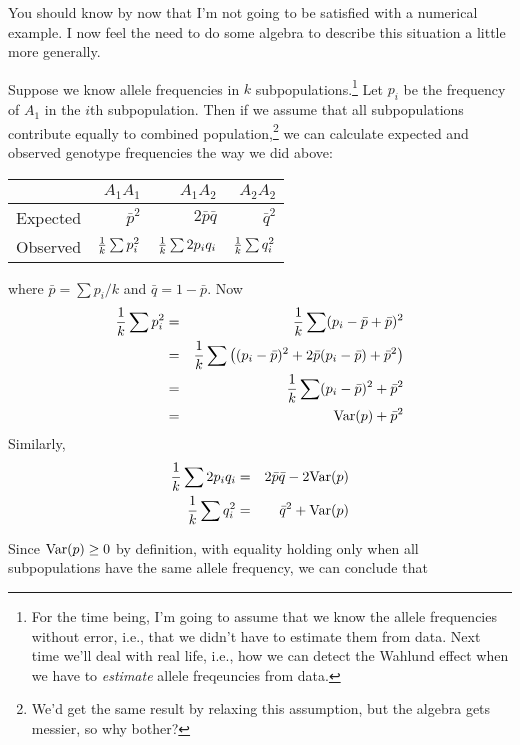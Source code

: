 You should know by now that I'm not going to be satisfied with a
numerical example. I now feel the need to do some algebra to describe
this situation a little more generally.

Suppose we know allele frequencies in $k$ subpopulations.\footnote{For
  the time being, I'm going to assume that we know the allele
  frequencies without error, i.e., that we didn't have to estimate
  them from data. Next time we'll deal with real life, i.e., how we
  can detect the Wahlund effect when we have to {\it estimate\/}
  allele freqeuncies from data.} Let $p_i$ be the frequency of $A_1$
in the $i$th subpopulation. Then if we assume that all subpopulations
contribute equally to combined population,\footnote{We'd get the same
  result by relaxing this assumption, but the algebra gets messier, so
  why bother?} we can calculate expected and observed genotype
frequencies the way we did above:

\begin{center}
\begin{tabular}{l|rrr}
\hline\hline
         & $A_1A_1$       & $A_1A_2$         & $A_2A_2$ \\
\hline
Expected & $\bar p^2$     & $2\bar p\bar q$  & $\bar q^2$ \\
Observed & $\frac{1}{k}\sum p_i^2$ & $\frac{1}{k}\sum 2p_iq_i$ & $\frac{1}{k}\sum q_i^2$ \\
\hline
\end{tabular}
\end{center}
where $\bar p = \sum p_i/k$ and $\bar q = 1 - \bar p$. Now
\begin{eqnarray}
\frac{1}{k}\sum p_i^2 &=& \frac{1}{k}\sum (p_i - \bar p + \bar p)^2 \\
&=& \frac{1}{k}\sum \left((p_i - \bar p)^2 + 2\bar p(p_i - \bar p)
                            + \bar p^2\right) \\
             &=& \frac{1}{k}\sum (p_i - \bar p)^2 + \bar p^2 \\
             &=& \hbox{Var}(p) + \bar p^2 \label{eq:p2}
\end{eqnarray}
Similarly,
\begin{eqnarray}
\frac{1}{k}\sum 2p_iq_i &=& 2\bar p\bar q - 2\hbox{Var}(p) \label{eq:2pq} \\
\frac{1}{k}\sum q_i^2   &=& \bar q^2 + \hbox{Var}(p) \label{eq:q2}
\end{eqnarray}

Since $\hbox{Var}(p) \ge 0$ by definition, with equality holding only
when all subpopulations have the same allele frequency, we can
conclude that

